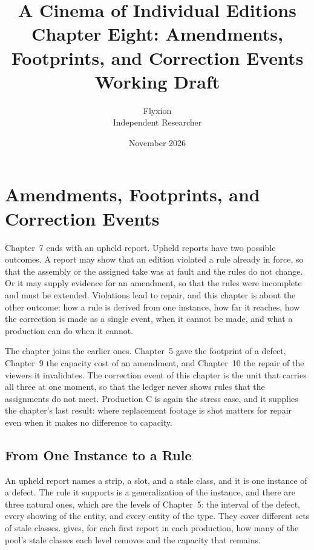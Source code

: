 \documentclass[11pt,twoside,openright]{book}
\title{\Huge\bfseries A Cinema of Individual Editions\\[1.2ex]
\large Chapter Eight: Amendments, Footprints, and Correction Events\\[0.4ex]
\large Working Draft}
\author{Flyxion\\[0.3ex]\small Independent Researcher}
\date{November 2026}
\theoremstyle{plain}
\theoremstyle{definition}
\theoremstyle{remark}
\begin{document}
\frontmatter
\maketitle
\tableofcontents
\mainmatter
\setcounter{chapter}{7}

\chapter{Amendments, Footprints, and Correction Events}
\label{ch:amend}

Chapter~7 ends with an upheld report. Upheld reports have two possible outcomes. A report may show that an edition violated a rule already in force, so that the assembly or the assigned take was at fault and the rules do not change. Or it may supply evidence for an amendment, so that the rules were incomplete and must be extended. Violations lead to repair, and this chapter is about the other outcome: how a rule is derived from one instance, how far it reaches, how the correction is made as a single event, when it cannot be made, and what a production can do when it cannot.

The chapter joins the earlier ones. Chapter~5 gave the footprint of a defect, Chapter~9 the capacity cost of an amendment, and Chapter~10 the repair of the viewers it invalidates. The correction event of this chapter is the unit that carries all three at one moment, so that the ledger never shows rules that the assignments do not meet. Production C is again the stress case, and it supplies the chapter's last result: where replacement footage is shot matters for repair even when it makes no difference to capacity.

\section{From One Instance to a Rule}\label{sec:general}

An upheld report names a strip, a slot, and a stale class, and it is one instance of a defect. The rule it supports is a generalization of the instance, and there are three natural ones, which are the levels of Chapter~5: the interval of the defect, every showing of the entity, and every entity of the type. They cover different sets of stale classes.  gives, for each first report in each production, how many of the pool's stale classes each level removes and the capacity that remains.
\end{document}

